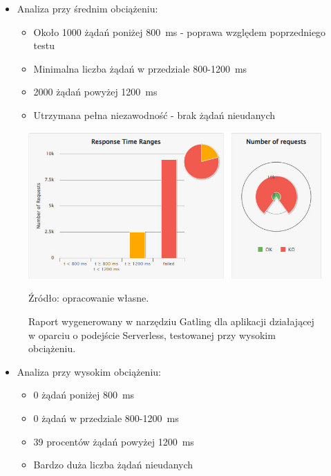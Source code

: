 \documentclass[runningheads,12pt]{llncs}
\begin{document}
\begin{itemize}
  \item Analiza przy średnim obciążeniu:
  \begin{itemize}
    \item Około 1000 żądań poniżej 800~ms - poprawa względem poprzedniego testu
    \item Minimalna liczba żądań w przedziale 800-1200~ms
    \item 2000 żądań powyżej 1200~ms
    \item Utrzymana pełna niezawodność - brak żądań nieudanych
  \end{itemize}
\end{itemize}

\newpage

\begin{figure}
    \includegraphics[width=\linewidth]{images/serverless-gatling-high-graph.jpg}
    \caption{Raport wygenerowany w narzędziu Gatling dla aplikacji działającej w oparciu o podejście Serverless, testowanej przy wysokim obciążeniu.} \label{fig3}
    \vspace{0.5em}
    {\small Źródło: opracowanie własne.}
\end{figure}

\begin{itemize}
  \item Analiza przy wysokim obciążeniu:
  \begin{itemize}
    \item 0 żądań poniżej 800~ms
    \item 0 żądań w przedziale 800-1200~ms
    \item 39 procentów żądań powyżej 1200~ms
    \item Bardzo duża liczba żądań nieudanych
  \end{itemize}
\end{itemize}
\end{document}
